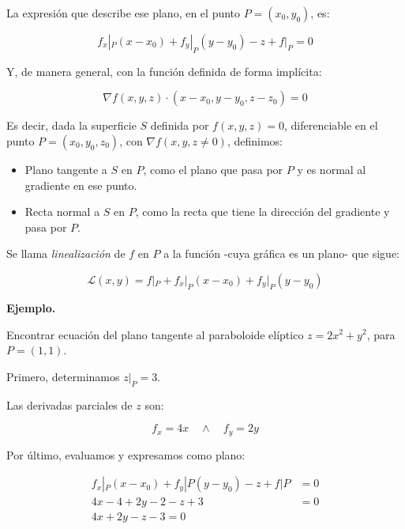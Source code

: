 La expresión que describe ese plano,
en el punto \(P = (x_0, y_0)\), es:

\begin{equation*}
    f_x|_P(x - x_0) + f_y|_P(y - y_0) - z + f|_P = 0
\end{equation*}

Y, de manera general, con la función definida de forma implícita:

\begin{equation*}
    \nabla f(x,y,z)\cdot(x-x_0,y-y_0,z-z_0) = 0
\end{equation*}

Es decir,
dada la superficie \(S\) definida por \(f(x,y,z) = 0\),
diferenciable en el punto \(P = (x_0,y_0,z_0)\),
con \(\nabla f (x,y,z \neq 0)\),
definimos:
\begin{itemize}
    \item Plano tangente a \(S\) en \(P\),
    como el plano que pasa por \(P\) y es normal al gradiente en ese punto.
    \item Recta normal a \(S\) en \(P\),
    como la recta que tiene la dirección del gradiente y pasa por \(P\).
\end{itemize}

Se llama \textit{linealización} de \(f\) en \(P\) a la función
-cuya gráfica es un plano- que sigue:

\begin{equation*}
    \mathcal{L}(x,y)= f|_P + f_x|_P(x - x_0) + f_y|_P(y - y_0)
\end{equation*}

\vspace{.5cm}
\textbf{Ejemplo.}

Encontrar ecuación del plano tangente al paraboloide elíptico 
\(z = 2x^{2} + y^{2}\),
para \(P = (1,1)\).

Primero, determinamos \(z|_P = 3\).

Las derivadas parciales de \(z\) son:

\begin{equation*}
    f_x = 4x \quad \land \quad f_y = 2y
\end{equation*}

Por último, evaluamos y expresamos como plano:

\begin{align*}
    f_x|_P(x - x_0) + f_y|P(y - y_0) - z + f|P & = 0 \\
    4x - 4 + 2y - 2 - z + 3 & = 0 \\
    \boxed{4x + 2y - z - 3 = 0} &
\end{align*}

